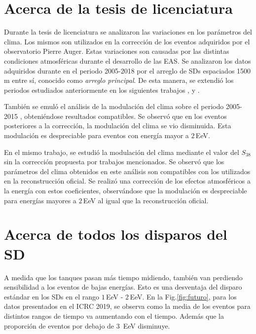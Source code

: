 
\section{Acerca de la tesis de licenciatura}

Durante la tesis de licenciatura se analizaron las variaciones en los parámetros del clima. Los mismos son utilizados en la corrección de los eventos adquiridos por el observatorio Pierre Auger. Estas variaciones son causadas por las distintas condiciones atmosféricas durante el desarrollo de las EAS. Se analizaron los datos adquiridos durante en el periodo 2005-2018 por el arreglo de SDs espaciados 1500 m entre sí, conocido como \emph{arreglo principal}. De esta manera, se extendió los periodos estudiados anteriormente en los siguientes trabajos \cite{abraham2009atmospheric}, \cite{abreu2012description}   y \cite{aab2017impact}. 

También se emuló el análisis de la modulación del clima sobre el periodo 2005-2015 \cite{aab2017impact}, obteniéndose resultados compatibles. Se observó que en los eventos posteriores a la corrección, la modulación del clima se vio disminuida. Esta modulación es despreciable para eventos con energía mayor a $2\,$EeV.

En el mismo trabajo, se estudió la modulación del clima mediante el valor del $S_{38}$ sin la corrección propuesta por trabajos mencionados. Se observó que los parámetros del clima obtenidos en este análisis son compatibles con los utilizados en la reconstrucción oficial. Se realizó una corrección de los efectos atmosféricos a la energía con estos coeficientes, observándose que la modulación es despreciable para energías mayores a $2\,$EeV al igual que la reconstrucción oficial. 

\section{Acerca de todos los disparos del SD}


A medida que los tanques pasan más tiempo midiendo, también van perdiendo sensibilidad a los eventos de bajas energías. Esto es una desventaja del disparo estándar en los SDs en el rango $1\,$EeV - $2\,$EeV. En la Fig.\ref{fig:futuro}, para los datos presentados en el ICRC 2019, se observa como la media de los eventos para distintos rangos de tiempo va aumentando con el tiempo. Además que la proporción de eventos por debajo de $3\,$ EeV disminuye. 

